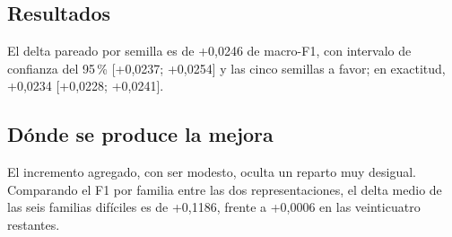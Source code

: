 \subsection{Resultados}

\begin{table}[ht]
\centering
\caption{Experimento 2e: aporte de los rasgos estructurales. Tres representaciones sobre la misma partición, sin emplear nombre ni extensión. Media y desvío sobre cinco semillas; 15.000 archivos, 30 familias, cinco pliegues.}
\label{tab:exp2e}
\end{table}

El delta pareado por semilla es de +0,0246 de macro-F1, con intervalo de confianza del 95\,\% [+0,0237; +0,0254] y las cinco semillas a favor; en exactitud, +0,0234 [+0,0228; +0,0241].

\subsection{Dónde se produce la mejora}

El incremento agregado, con ser modesto, oculta un reparto muy desigual. Comparando el F1 por familia entre las dos representaciones, el delta medio de las seis familias difíciles es de +0,1186, frente a +0,0006 en las veinticuatro restantes.

